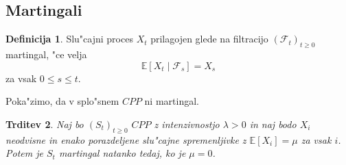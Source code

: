 \documentclass[12pt, a4paper, reqno]{amsart}
\theoremstyle{definition}
\newtheorem{definicija}{Definicija}[section]
\theoremstyle{plain}
\newtheorem{trditev}[definicija]{Trditev}
\newcommand{\R}{\mathbb{R}}
\newcommand{\E}{\mathbb{E}}
\newcommand{\F}{\mathcal{F}}
\newcommand{\Prob}{\mathbb{P}}
\newcommand{\1}{\mathds{1}}
\begin{document}
%
%
%
%
%
%
%
%

    \subsection{Martingali}

        \begin{definicija}
            Slu"cajni proces $X_t$ prilagojen glede na filtracijo $(\F_t)_{t\geq0}$
            martingal, "ce velja 
            $$
                \E\left[X_t\mid\F_s\right] = X_s
            $$
            za vsak $0\leq s \leq t$.
            \label{def:martingal}
        \end{definicija}

        Poka"zimo, da v splo"snem $CPP$ ni martingal.

        \begin{trditev}
            Naj bo $(S_t)_{t\geq0}$ $CPP$ z intenzivnostjo $\lambda>0$ in naj bodo $X_i$ neodvisne
            in enako porazdeljene slu"cajne spremenljivke z $\E\left[X_i\right] = \mu$ za vsak $i$.
            Potem je $S_t$ martingal natanko tedaj, ko je $\mu = 0$.
            \label{trd:CPPnimartingal}
        \end{trditev}
\end{document}
